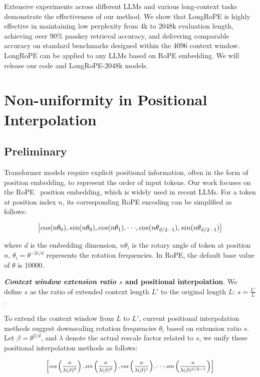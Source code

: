Extensive experiments across different LLMs and various long-context tasks demonstrate the effectiveness of our method. We show that LongRoPE is highly effective in maintaining low perplexity from 4k to 2048k evaluation length,  achieving over 90\% passkey retrieval accuracy, and delivering  comparable accuracy on standard benchmarks designed within the 4096 context window.  LongRoPE can be applied to any LLMs based on RoPE embedding. We will release our code and LongRoPE-2048k models.

\section{Non-uniformity in Positional Interpolation}
\label{sec:analysis}

\subsection{Preliminary}

Transformer models require explicit positional information, often in the form of position embedding, to represent the order of input tokens. Our work focuses on the RoPE~\cite{rope} position embedding, which is widely used in recent  LLMs. For a token at position index $n$, its corresponding RoPE encoding can be simplified as follows:

\begin{equation}
		\fontsize{7.8}{7.8} \selectfont
	\label{eq:rope}
	\left[ cos(n\theta_0), sin(n\theta_0), cos(n\theta_1), \cdot\cdot\cdot, cos(n\theta_{d/2-1}), sin(n\theta_{d/2-1}) \right]   
\end{equation}

where $d$ is the embedding dimension, 
 $n\theta_i$ is the rotary angle of token at position $n$, 
$\theta_i=\theta^{-2i/d}$ represents the rotation frequencies. In RoPE, the default base value of $\theta$ is 10000. 

\textbf{\emph{Context window extension ratio $s$} and positional interpolation}. We define $s$ as  the ratio of extended context length $L'$ to the original length $L$: $s=\frac{L'}{L}$. 

To extend the context window from $L$ to $L'$, current positional interpolation methods suggest downscaling rotation frequencies $\theta_i$ based on extension ratio $s$. Let $\beta=\theta^{2/d}$, and $\lambda$ denote the actual rescale factor related to $s$, we   unify these positional interpolation methods as follows:

\begin{equation}	
	\fontsize{7.5}{7.5} \selectfont
	\label{eq:unified_rope}
	\begin{aligned}
		\left[cos\left(\frac{n}{\lambda(\beta)^0}\right), sin \left(\frac{n}{\lambda(\beta)^0}\right), cos\left(\frac{n}{\lambda(\beta)^1}\right), \cdot\cdot\cdot,  sin \left(\frac{n}{\lambda(\beta)^{d/2-1}}\right) \right]   
	\end{aligned}
\end{equation}

